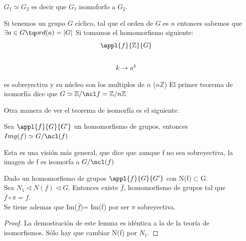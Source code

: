 \documentclass{apuntes}
\newenvironment{notacion}[1][Notación:]{\begin{trivlist}
\item[\hskip \labelsep {\bfseries #1}]}{\end{trivlist}}
\begin{document}
\begin{notacion}
$G_1 \simeq G_2$ es decir que $G_1$ isomoforfo a $G_2$.
\end{notacion}

\begin{example}
Si tenemos un grupo $G$ cíclico, tal que el orden de $G$ es $n$ entonces sabemos que
$\exists a \in G \tq ord(a) = |G|$
Si tomamos el homomorfismo siguiente:\\
$$\appl{f}{\mathbb{Z}}{G}$$\\
$$k \longrightarrow a^k$$\\
es sobreyectiva y su núcleo son los multiplos de $n$ ($n\mathbb{Z}$)
El primer teorema de isomorfía dice que $G \simeq \mathbb{Z}/\ncl f  = \mathbb{Z}/n\mathbb{Z}$
\end{example}

Otra manera de ver el teorema de isomorfía es el siguiente.
\begin{theorem}
Sea $\appl{f}{G}{G'}$ un homomorfismo de grupos, entonces $Img(f) \simeq G/\ncl(f)$
\end{theorem}

Esta es una visión más general, que dice que aunque f no sea sobreyectiva, la imagen de f es isomorfa a $G/\ncl(f)$

\begin{lemma}
 Dado un homomorfismo de grupos $\appl{f}{G}{G'}$  con N(f)$\subset$G.\\
 Sea $N_1 \vartriangleleft N(f) \vartriangleleft G$. Entonces existe $\bar{f}$, homomorfismo de grupos tal que $\bar{f}\circ\pi=f$.\\
 Se tiene ademas que Im($\bar{f}$)= Im(f) por ser $\pi$  sobreyectiva.
\end{lemma}
\begin{proof}
 La demostración de este lemma es idéntica a la de la teoría de isomorfismos. Sólo hay que cambiar N(f) por $N_1$.
\end{proof}
\end{document}
